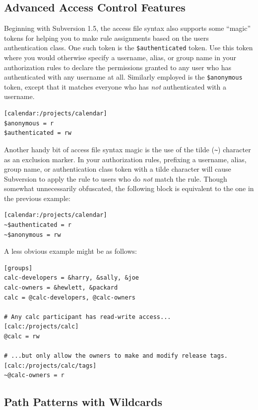 \subsection{Advanced Access Control
Features}\label{svn.serverconfig.pathbasedauthz.authclass-tokens}

Beginning with Subversion 1.5, the access file syntax also supports some
``magic'' tokens for helping you to make rule assignments based on the
user\textquotesingle s authentication class. One such token is the
\texttt{\$authenticated} token. Use this token where you would otherwise
specify a username, alias, or group name in your authorization rules to
declare the permissions granted to any user who has authenticated with
any username at all. Similarly employed is the \texttt{\$anonymous}
token, except that it matches everyone who has \emph{not} authenticated
with a username.

\begin{verbatim}
[calendar:/projects/calendar]
$anonymous = r
$authenticated = rw
\end{verbatim}

Another handy bit of access file syntax magic is the use of the tilde
(\texttt{\textasciitilde{}}) character as an exclusion marker. In your
authorization rules, prefixing a username, alias, group name, or
authentication class token with a tilde character will cause Subversion
to apply the rule to users who do \emph{not} match the rule. Though
somewhat unnecessarily obfuscated, the following block is equivalent to
the one in the previous example:

\begin{verbatim}
[calendar:/projects/calendar]
~$authenticated = r
~$anonymous = rw
\end{verbatim}

A less obvious example might be as follows:

\begin{verbatim}
[groups]
calc-developers = &harry, &sally, &joe
calc-owners = &hewlett, &packard
calc = @calc-developers, @calc-owners

# Any calc participant has read-write access...
[calc:/projects/calc]
@calc = rw

# ...but only allow the owners to make and modify release tags.
[calc:/projects/calc/tags]
~@calc-owners = r
\end{verbatim}

\subsection{Path Patterns with
Wildcards}\label{svn.serverconfig.pathbasedauthz.wildcards}

